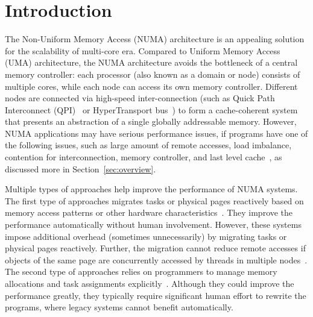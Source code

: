 
\section{Introduction}
\label{sec:intro}

The Non-Uniform Memory Access (NUMA) architecture is an appealing solution for the scalability of multi-core era. Compared to Uniform Memory Access (UMA) architecture, the NUMA architecture avoids the bottleneck of a central memory controller: each processor (also known as a domain or node) consists of multiple cores, while each node can access its own memory controller. Different nodes are connected via high-speed inter-connection (such as Quick Path Interconnect (QPI)~\cite{intelqpi} or HyperTransport bus~\cite{hypertransport}) to form a cache-coherent system that presents an abstraction of a single globally addressable memory. 
However, NUMA applications may have serious performance issues, if programs have one of the following issues, such as large amount of remote accesses, load imbalance, contention for interconnection, memory controller, and last level cache~\cite{Blagodurov:2011:CNC:2002181.2002182, Dashti:2013:TMH:2451116.2451157}, as discussed more in Section~\ref{sec:overview}. 

Multiple types of approaches help improve the performance of NUMA systems. The first type of approaches migrates tasks or physical pages reactively based on memory access patterns or other hardware characteristics~\cite{Blagodurov:2011:CNC:2002181.2002182, AutoNUMA, Dashti:2013:TMH:2451116.2451157, Lepers:2015:TMP:2813767.2813788}. They improve the performance automatically without human involvement. However, these systems impose additional overhead (sometimes unnecessarily)  by migrating tasks or physical pages reactively. Further, the migration cannot reduce remote accesses if objects of the same page are concurrently accessed by  threads in multiple nodes~\cite{Gaud:2014:LPM:2643634.2643659}. 
The second type of approaches relies on programmers to manage memory allocations and task assignments explicitly~\cite{Kaestle:2015:SSA:2813767.2813787, Lin:2016:MTP:2872362.2872401, Majo:2017:LPC:3057718.3040222}. Although they could improve the performance greatly, they typically require significant human effort to rewrite the programs, where legacy systems cannot benefit automatically. 

